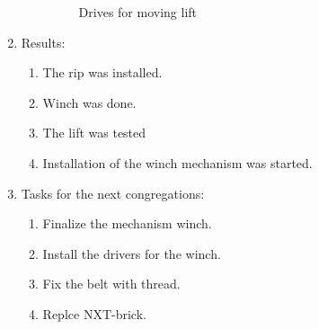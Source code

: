 \begin{enumerate}
\begin{enumerate}
      \begin{figure}[H]
      	\begin{minipage}[h]{1\linewidth}
      		\caption{Drives for moving lift}
      	\end{minipage}
      \end{figure}
      
    \end{enumerate}
    
	\item Results: 
	\begin{enumerate}
	  \item	The rip was installed.
	  
	  \item	Winch was done.
	  
	  \item	The lift was tested
	  
	  \item	Installation of the winch mechanism was started.
	   
    \end{enumerate}
    
	\item Tasks for the next congregations:
	\begin{enumerate}
	  \item	Finalize the mechanism winch.
	  
	  \item	Install the drivers for the winch.
	  
	  \item	Fix the belt with thread.
	  
	  \item	Replce NXT-brick.
	  
    \end{enumerate}     
\end{enumerate}
\fillpage
